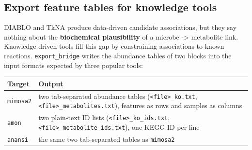\documentclass[
]{book}
\newcounter{none} %
\begin{document}
\subsection{Export feature tables for knowledge tools}\label{export-feature-tables-for-knowledge-tools}

DIABLO and TkNA produce data-driven candidate associations, but they say nothing about the \textbf{biochemical plausibility} of a microbe -\textgreater{} metabolite link.
Knowledge-driven tools fill this gap by constraining associations to known reactions.
\texttt{export\_bridge} writes the abundance tables of two blocks into the input formats expected by three popular tools:

{\def\LTcaptype{none} %
\begin{longtable}[]{@{}
  >{\raggedright\arraybackslash}p{}
  >{\raggedright\arraybackslash}p{}@{}}
\toprule\noalign{}
\begin{minipage}[b]{\linewidth}\raggedright
Target
\end{minipage} & \begin{minipage}[b]{\linewidth}\raggedright
Output
\end{minipage} \\
\midrule\noalign{}
\endhead
\bottomrule\noalign{}
\endlastfoot
\texttt{mimosa2} & two tab-separated abundance tables (\texttt{\textless{}file\textgreater{}\_ko.txt}, \texttt{\textless{}file\textgreater{}\_metabolites.txt}), features as rows and samples as columns \\
\texttt{amon} & two plain-text ID lists (\texttt{\textless{}file\textgreater{}\_ko\_ids.txt}, \texttt{\textless{}file\textgreater{}\_metabolite\_ids.txt}), one KEGG ID per line \\
\texttt{anansi} & the same two tab-separated tables as \texttt{mimosa2} \\
\end{longtable}
}
\end{document}
